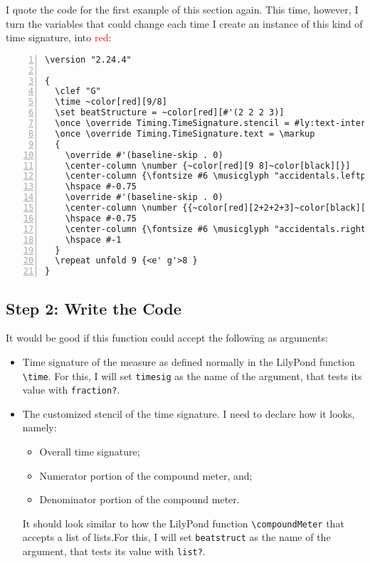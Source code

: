 I quote the code for the first example of this section again. This time, however, I turn the variables that could change each time I create an instance of this kind of time signature, into \textcolor{red}{red}:

\begin{Verbatim}[numbers=left,xleftmargin=5mm,commandchars={~[]}]
\version "2.24.4"

{
  \clef "G"
  \time ~color[red][9/8]
  \set beatStructure = ~color[red][#'(2 2 2 3)]
  \once \override Timing.TimeSignature.stencil = #ly:text-interface::print
  \once \override Timing.TimeSignature.text = \markup
  {
    \override #'(baseline-skip . 0)
    \center-column \number {~color[red][9 8]~color[black][}]
    \center-column {\fontsize #6 \musicglyph "accidentals.leftparen"}
    \hspace #-0.75
    \override #'(baseline-skip . 0)
    \center-column \number {{~color[red][2+2+2+3]~color[black][}{]~color[red][8]~color[black][}}]
    \hspace #-0.75
    \center-column {\fontsize #6 \musicglyph "accidentals.rightparen"}
    \hspace #-1
  }
  \repeat unfold 9 {<e' g'>8 }
}
\end{Verbatim}



\subsection{Step 2: Write the Code}

It would be good if this function could accept the following as arguments:

\begin{itemize}
\item Time signature of the measure as defined normally in the LilyPond function \verb|\time|. For this, I will set \verb|timesig| as the name of the argument, that tests its value with \verb|fraction?|.
\item The customized stencil of the time signature. I need to declare how it looks, namely:
\begin{itemize}
\item Overall time signature;
\item Numerator portion of the compound meter, and;
\item Denominator portion of the compound meter.
\end{itemize} 
It should look similar to how the LilyPond function \verb|\compoundMeter| that accepts a list of lists.For this, I will set \verb|beatstruct| as the name of the argument, that tests its value with \verb|list?|.
\end{itemize}

